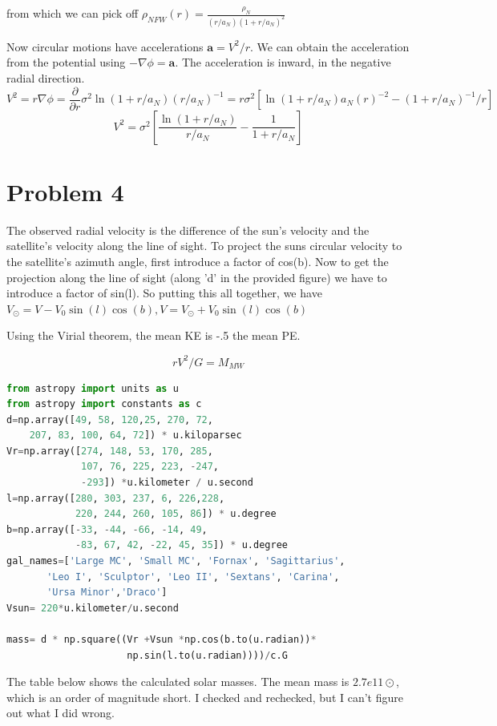 \documentclass[12pt]{article}
\begin{document}
from which we can pick off $\rho_{NFW}(r) = \frac{\rho_{N}}{(r/a_{N})(1 + r/a_{N})^{2}}$

Now circular motions have accelerations $\mathbf{a} = V^{2}/r$. We can obtain the acceleration from the potential using $-\nabla \phi = \mathbf{a}$. The acceleration is inward, in the negative radial direction.
$$ V^{2} = r \nabla \phi = \frac{\partial}{\partial r}  \sigma^{2} \ln (1 + r/a_{N} ) (r/a_{N})^{-1} = r\sigma^{2}[\ln (1 + r/a_{N})a_{N}(r)^{-2} - (1 + r/a_{N})^{-1}/r] $$
$$ V^{2}  = \sigma^{2} [\frac{\ln(1 + r/a_{N})}{r/a_{N}} - \frac{1}{1 + r/a_{N}}] $$

\section{Problem 4}
The observed radial velocity is the difference of the sun's velocity and the satellite's velocity along the line of sight. To project the suns  circular velocity to the satellite's azimuth angle, first introduce a factor of cos(b). Now to get the projection along the line of sight (along 'd' in the provided figure) we have to introduce a factor of sin(l). So putting this all together, we have $V_{\odot} = V - V_{0}\sin(l)\cos(b), V = V_{\odot} + V_{0}\sin(l)\cos(b)$

Using the Virial theorem, the mean KE is -.5 the mean PE.

$$ r V^{2} / G = M_{MW}  $$

\begin{lstlisting}[language=Python]
from astropy import units as u
from astropy import constants as c
d=np.array([49, 58, 120,25, 270, 72,
	207, 83, 100, 64, 72]) * u.kiloparsec 
Vr=np.array([274, 148, 53, 170, 285,
             107, 76, 225, 223, -247,
             -293]) *u.kilometer / u.second 
l=np.array([280, 303, 237, 6, 226,228,
            220, 244, 260, 105, 86]) * u.degree
b=np.array([-33, -44, -66, -14, 49,
            -83, 67, 42, -22, 45, 35]) * u.degree
gal_names=['Large MC', 'Small MC', 'Fornax', 'Sagittarius',
       'Leo I', 'Sculptor', 'Leo II', 'Sextans', 'Carina',
       'Ursa Minor','Draco']
Vsun= 220*u.kilometer/u.second

mass= d * np.square((Vr +Vsun *np.cos(b.to(u.radian))*
                     np.sin(l.to(u.radian))))/c.G

\end{lstlisting}

The table below shows the calculated solar masses. The mean mass is $2.7e11 \odot $, which is an order of magnitude short. I checked and rechecked, but I can't figure out what I did wrong.
\end{document}
